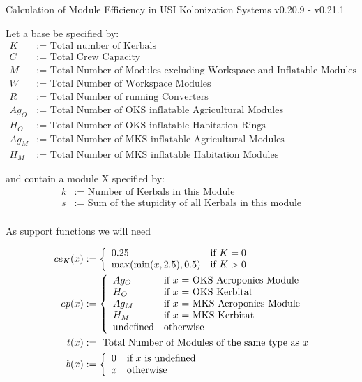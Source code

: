 \documentclass[11pt]{report}
\begin{document}
Calculation of Module Efficiency in USI Kolonization Systems v0.20.9 - v0.21.1

Let a base be specified by:
\begin{align*}
  K & := \textrm{ Total number of Kerbals}\\
  C & := \textrm{ Total Crew Capacity}\\
  M & := \textrm{ Total Number of Modules excluding Workspace and Inflatable Modules}\\
  W & := \textrm{ Total Number of Workspace Modules}\\
  R & := \textrm{ Total Number of running Converters}\\
  Ag_O & := \textrm{ Total Number of OKS inflatable Agricultural Modules}\\
  H_O & := \textrm{ Total Number of OKS inflatable Habitation Rings}\\
  Ag_M & := \textrm{ Total Number of MKS inflatable Agricultural Modules}\\
  H_M & := \textrm{ Total Number of MKS inflatable Habitation Modules}
\end{align*}

and contain a module X specified by:
\begin{align*}
  k & := \textrm{ Number of Kerbals in this Module}\\
  s & := \textrm{ Sum of the stupidity of all Kerbals in this module}\\
\end{align*}

As support functions we will need

\begin{align*}
ce_K(x) & := \left\{
  \begin{array}{l l}
    0.25 & \textrm{if } K = 0\\
    \max(\min(x, 2.5), 0.5) &\textrm{if } K > 0
  \end{array}
\right.\\
ep(x) & :=\left\{
  \begin{array}{l l}
    Ag_O & \textrm{if $x$ = OKS Aeroponics Module}\\
    H_O & \textrm{if $x$ = OKS Kerbitat}\\
    Ag_M & \textrm{if $x$ = MKS Aeroponics Module}\\
    H_M & \textrm{if $x$ = MKS Kerbitat}\\
    \textrm{undefined} & \textrm{otherwise}
  \end{array}
\right.\\
t(x) & := \textrm{ Total Number of Modules of the same type as $x$}\\
b(x) & := \left\{
  \begin{array}{l l}
    0 & \textrm{if $x$ is undefined}\\
    x & \textrm{otherwise}
  \end{array}
\right.
\end{align*}
\end{document}
